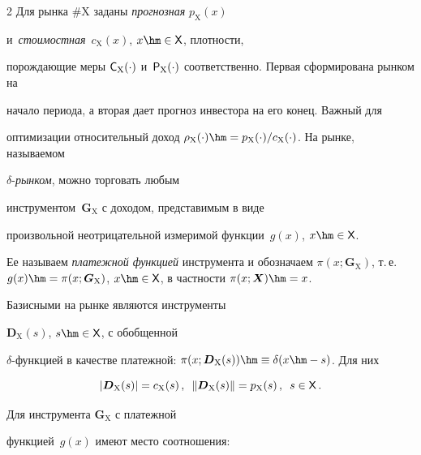 \begin{multicols}{2}
  Для рынка \#X заданы \textit{прогнозная} $p_{\mathrm{X}}(x)$ 


и~\textit{стоимостная}~$c_{\mathrm{X}}(x)$, $x\hm\in {\sf X}$, плотности, 


порождающие меры ${\sf C}_{\mathrm{X}}(\cdot)$ и~${\sf 


P}_{\mathrm{X}}(\cdot)$ соответственно. Первая сформирована рынком на 


начало периода, а вторая дает прогноз инвестора на его конец. Важный для 


оптимизации относительный доход $\rho_{\mathrm{X}}(\cdot)\hm=  


p_{\mathrm{X}}(\cdot)/c_{\mathrm{X}}(\cdot)$. На рынке, называемом  


$\delta$-\textit{рын\-ком}, можно торговать любым 


инструментом~$\boldsymbol{G}_{\mathrm{X}}$ с доходом, представимым в виде 


произвольной неотрицательной измеримой функции~$g(x)$, $x\hm\in {\sf X}$. 


Ее называем \textit{платежной функцией} инструмента и обозначаем $\pi(x; 


\boldsymbol{G}_{\mathrm{X}})$, т.\,е.\ $g(x) \hm= \pi(x; 


\boldsymbol{G}_{\mathrm{X}})$, $x\hm\in {\sf X}$, в частности $\pi(x; 


\boldsymbol{X})\hm = x$. 


  


  Базисными на рынке являются инструменты 


$\boldsymbol{D}_{\mathrm{X}}(s)$, $s \hm\in {\sf  X}$, с обобщенной  


$\delta$-функ\-ци\-ей в качестве платежной: $\pi(x; 


\boldsymbol{D}_{\mathrm{X}}(s)) \hm\equiv  \delta(x \hm- s)$. Для них 


  $$\left\vert \boldsymbol{D}_{\mathrm{X}}(s)\right\vert 


=c_{\mathrm{X}}(s)\,,\enskip \left\| 


\boldsymbol{D}_{\mathrm{X}}(s)\right\| =p_{\mathrm{X}}(s)\,,\enskip s\in 


{\sf X}\,.


  $$


  


  Для инструмента $\boldsymbol{G}_{\mathrm{X}}$ с платежной 


функцией~$g(x)$ имеют место соотношения: 



\end{multicols}
